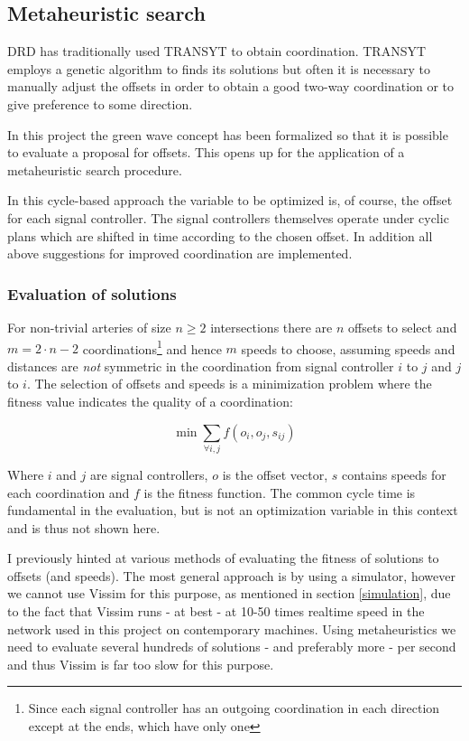 \subsection{Metaheuristic search}
DRD has traditionally used TRANSYT to obtain coordination. TRANSYT employs a genetic algorithm to finds its solutions but often it is necessary to manually adjust the offsets in order to obtain a good two-way coordination or to give preference to some direction.

In this project the green wave concept has been formalized so that it is possible to evaluate a proposal for offsets. This opens up for the application of a metaheuristic search procedure.

In this cycle-based approach the variable to be optimized is, of course, the offset for each signal controller. The signal controllers themselves operate under cyclic plans which are shifted in time according to the chosen offset. In addition all above suggestions for improved coordination are implemented.

\subsubsection*{Evaluation of solutions}
\label{eval_coord}
For non-trivial arteries of size $n \geq 2$ intersections there are $n$ offsets to select and $m = 2 \cdot n - 2$ coordinations\footnote{Since each signal controller has an outgoing coordination in each direction except at the ends, which have only one} and hence $m$ speeds to choose, assuming speeds and distances are \textit{not} symmetric in the coordination from signal controller $i$ to $j$ and $j$ to $i$.
The selection of offsets and speeds is a minimization problem where the fitness value indicates the quality of a coordination:

$$ \min \sum_{\forall i,j} f(o_i,o_j,s_{ij})$$

Where $i$ and $j$ are signal controllers, $o$ is the offset vector, $s$ contains speeds for each coordination and $f$ is the fitness function. The common cycle time is fundamental in the evaluation, but is not an optimization variable in this context and is thus not shown here.

I previously hinted at various methods of evaluating the fitness of solutions to offsets (and speeds). The most general approach is by using a simulator, however we cannot use Vissim for this purpose, as mentioned in section \ref{simulation}, due to the fact that Vissim runs - at best - at 10-50 times realtime speed in the network used in this project on contemporary machines. Using metaheuristics we need to evaluate several hundreds of solutions - and preferably more - per second and thus Vissim is far too slow for this purpose.

